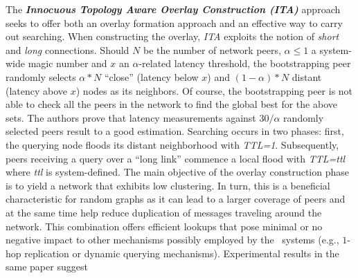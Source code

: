 The \textbf{\emph{Innocuous Topology Aware Overlay Construction (ITA)}}
approach~\cite{PRFM2013} seeks to offer both an overlay formation approach and
an effective way to carry out searching. When constructing the overlay,
\emph{ITA} exploits the notion of \emph{short} and \emph{long} connections.
Should $N$ be the number of network peers,  $\alpha \leq 1 $ a system-wide magic
number and $x$ an $\alpha$-related latency threshold, the bootstrapping peer
randomly selects $\alpha \ast N$ ``close'' (latency below $x$) and 
$\left( 1 - \alpha \right) \ast N$ distant (latency above $x$) nodes
as its neighbors. Of course, the bootstrapping peer is not able to check all the
peers in the network to find the global best for the above sets. The authors
prove that latency measurements against $30/ \alpha$ randomly selected peers
result to a good estimation. 
Searching occurs in two phases: first, the querying node
floods its distant neighborhood  with \emph{TTL=1}.
Subsequently, peers receiving a query over a ``long link'' commence a 
local flood with \emph{TTL=ttl} where \emph{ttl} is system-defined.
The main objective of the overlay construction phase is to yield a network that
exhibits low clustering. In turn, this is a beneficial characteristic for
random graphs as it can lead to a larger coverage of peers and at the same time
help reduce duplication of messages traveling around the network. This
combination offers efficient lookups that pose minimal or no negative impact to
other mechanisms possibly employed by the \p\ systems (e.g., $1$-hop replication
or dynamic querying mechanisms). Experimental results in the same paper suggest
